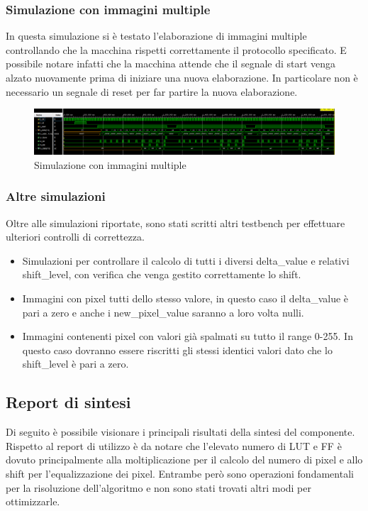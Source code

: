\documentclass{article}
\begin{document}
\subsubsection{Simulazione con immagini multiple}
In questa simulazione si è testato l'elaborazione di immagini multiple controllando che la macchina rispetti correttamente il protocollo specificato. E possibile notare infatti che la macchina attende che il segnale di start venga alzato nuovamente prima di iniziare una nuova elaborazione. In particolare non è necessario un segnale di reset per far partire la nuova elaborazione.
\begin{figure}[h]
    \includegraphics[width=\textwidth]{test-multiple-images.png}
    \centering
    \caption{Simulazione con immagini multiple}
\end{figure}

\subsubsection{Altre simulazioni}
Oltre alle simulazioni riportate, sono stati scritti altri testbench per effettuare ulteriori controlli di correttezza.
\begin{itemize}
    \item Simulazioni per controllare il calcolo di tutti i diversi delta\_value e relativi shift\_level, con verifica che venga gestito correttamente lo shift.
    \item Immagini con pixel tutti dello stesso valore, in questo caso il delta\_value è pari a zero e anche i new\_pixel\_value saranno a loro volta nulli.
    \item Immagini contenenti pixel con valori già spalmati su tutto il range 0-255. In questo caso dovranno essere riscritti gli stessi identici valori dato che lo shift\_level è pari a zero.
\end{itemize}

\pagebreak

\subsection{Report di sintesi}
Di seguito è possibile visionare i principali risultati della sintesi del componente. Rispetto al report di utilizzo è da notare che l'elevato numero di LUT e FF è dovuto principalmente alla moltiplicazione per il calcolo del numero di pixel e allo shift per l'equalizzazione dei pixel. Entrambe però sono operazioni fondamentali per la risoluzione dell'algoritmo e non sono stati trovati altri modi per ottimizzarle.
\end{document}
